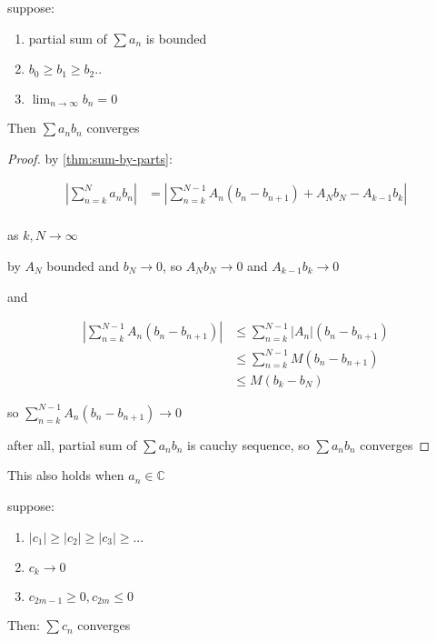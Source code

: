 \begin{thm}
    \label{thm:3-6-4}
   suppose:
   
   \begin{enumerate}
    \item partial sum of $\sum a_n$ is bounded
    
    \item $b_0 \ge b_1 \ge b_2 ..$

    \item $\lim_{n \to \infty}b_n = 0$
   \end{enumerate}

   Then $\sum a_nb_n$ converges
\end{thm}

\begin{proof}
    by \autoref{thm:sum-by-parts}:

    \begin{align*}
        \left| \sum_{n=k}^{N}a_nb_n \right| &= \left|\sum_{n=k}^{N-1}A_n(b_n - b_{n+1}) + A_Nb_N - A_{k-1}b_k \right| \\ 
    \end{align*}

    as $k,N \to \infty $

    by $A_N$ bounded and $b_N \to 0 $, so $A_Nb_N \to 0$ and $A_{k-1}b_k \to 0$

    and

    \begin{align*}
        \left|  \sum_{n=k}^{N-1}A_n(b_n - b_{n+1}) \right| &\le   \sum_{n=k}^{N-1} \left|A_n \right|(b_n - b_{n+1})  \\
        & \le \sum_{n=k}^{N-1}M(b_n - b_{n+1}) \\
        & \le M (b_k - b_N)
    \end{align*}

    so $\sum_{n=k}^{N-1}A_n(b_n - b_{n+1}) \to 0$

    after all, partial sum of $\sum a_n b_n$ is cauchy sequence, so $\sum a_n b_n$ converges
\end{proof}

\begin{corollary}
    This also holds when $a_n \in \mathbb{C}$
\end{corollary}

\begin{thm}
    suppose:

    \begin{enumerate}
        \item $\lvert c_1 \rvert \ge \lvert c_2 \rvert \ge \lvert c_3 \rvert \ge ...$

        \item $c_k \to 0$

        \item $c_{2m-1} \ge 0, c_{2m} \le 0$
    \end{enumerate}

    Then: $\sum c_n$ converges
\end{thm}

